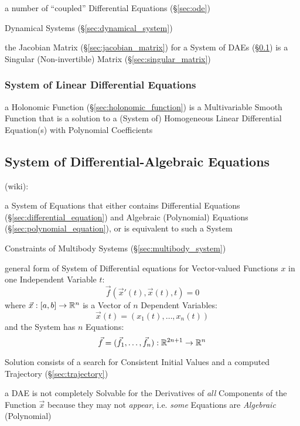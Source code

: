 a number of ``coupled'' Differential Equations (\S\ref{sec:ode})

\fist Dynamical Systems (\S\ref{sec:dynamical_system})

\fist the Jacobian Matrix (\S\ref{sec:jacobian_matrix}) for a System of DAEs
(\S\ref{sec:system_of_daes}) is a Singular (Non-invertible) Matrix
(\S\ref{sec:singular_matrix})



\subsubsection{System of Linear Differential Equations}
\label{sec:system_of_linear_odes}

a Holonomic Function (\S\ref{sec:holonomic_function}) is a Multivariable Smooth
Function that is a solution to a (System of) Homogeneous Linear Differential
Equation(s) with Polynomial Coefficients



\subsection{System of Differential-Algebraic Equations}
\label{sec:system_of_daes}

(wiki):

a System of Equations that either contains Differential Equations
(\S\ref{sec:differential_equation}) and Algebraic (Polynomial) Equations
(\S\ref{sec:polynomial_equation}), or is equivalent to such a System

\fist Constraints of Multibody Systems (\S\ref{sec:multibody_system})

general form of System of Differential equations for Vector-valued Functions
$x$ in one Independent Variable $t$:
\[
  \vec{f}(\vec{x}'(t), \vec{x}(t), t) = 0
\]
where $\vec{x} : [a,b] \rightarrow \mathbb{R}^n$ is a Vector of $n$ Dependent
Variables:
\[
  \vec{x}(t) = (x_1(t), \ldots, x_n(t))
\]
and the System has $n$ Equations:
\[
  \vec{f} = (\vec{f}_1, \ldots, \vec{f}_n) : \mathbb{R}^{2n+1} \rightarrow \mathbb{R}^n
\]

Solution consists of a search for Consistent Initial Values and a computed
Trajectory (\S\ref{sec:trajectory})

a DAE is not completely Solvable for the Derivatives of \emph{all} Components
of the Function $\vec{x}$ because they may not \emph{appear}, i.e. \emph{some}
Equations are \emph{Algebraic} (Polynomial)

